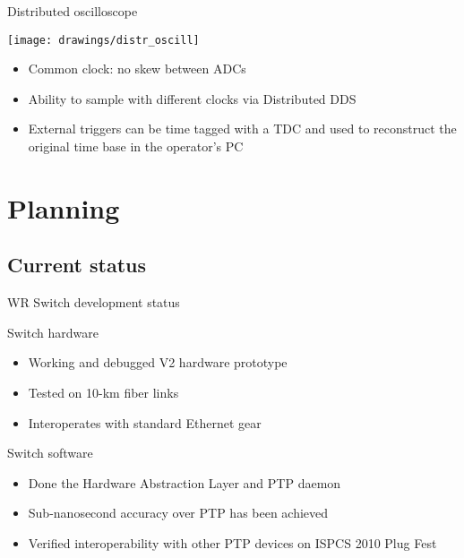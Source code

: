 \documentclass[compress,red]{beamer}
\begin{document}
\begin{frame}{Distributed oscilloscope}
  \begin{center}
    \texttt{[image: drawings/distr\_oscill]}
    \end{center}
    \begin{block}{}
      \begin{itemize}
      \item Common clock: no skew between ADCs
      \item Ability to sample with different clocks via Distributed DDS
      \item External triggers can be time tagged with a TDC and used to reconstruct the original time base in the operator's PC
      \end{itemize}
    \end{block}
\end{frame}



\section{Planning}

\subsection{Current status}

\begin{frame}{WR Switch development status}
	\begin{block}{Switch hardware}
          \begin{itemize}
            \item Working and debugged V2 hardware prototype
            \item Tested on 10-km fiber links
            \item Interoperates with standard Ethernet gear
            \end{itemize}
            \end{block}

	\begin{block}{Switch software}
          \begin{itemize}
            \item Done the Hardware Abstraction Layer and PTP daemon
            \item Sub-nanosecond accuracy over PTP has been achieved
            \item Verified interoperability with other PTP devices on ISPCS 2010 Plug Fest
            \end{itemize}
          \end{block}
\end{frame}
\end{document}
